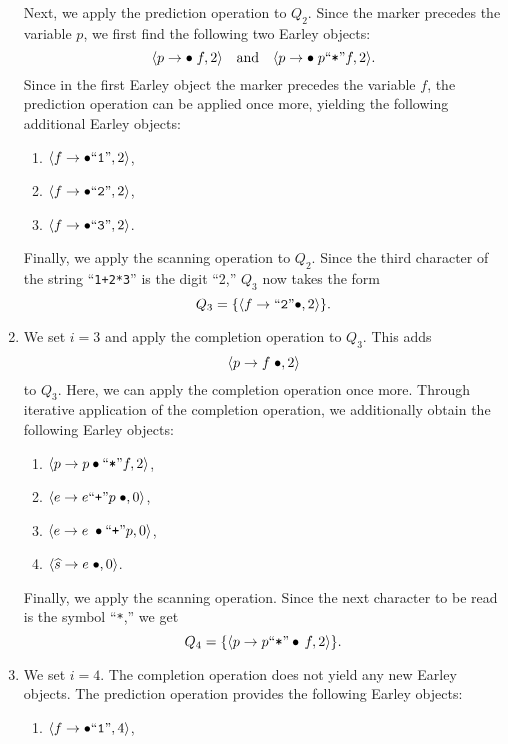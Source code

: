 \begin{enumerate}
      Next, we apply the prediction operation to $Q_2$. Since the marker precedes the variable $p$, we first
      find the following two Earley objects:   
      \[
        \pair(p \rightarrow \bullet\; f, 2) \quad \text{and} \quad \pair(p \rightarrow \bullet\; p \squoted{*} f, 2).
      \]  
      Since in the first Earley object the marker precedes the variable $f$, the prediction operation can be
      applied once more, yielding the following additional Earley objects:   
      \begin{enumerate}
      \item $\pair(f \rightarrow \bullet \squoted{1}, 2)$, 
      \item $\pair(f \rightarrow \bullet \squoted{2}, 2)$,
      \item $\pair(f \rightarrow \bullet \squoted{3}, 2)$.
      \end{enumerate}  
      Finally, we apply the scanning operation to $Q_2$. Since the third character of the string
      “\texttt{1+2*3}” is the digit “2,” $Q_3$ now takes the form   
      \[
        Q_3 = \{ \pair(f \rightarrow \squoted{2}\bullet, 2) \}.
      \]
\item We set $i = 3$ and apply the completion operation to $Q_3$. This adds  
      \[
        \pair(p \rightarrow f \;\bullet, 2)
      \]  
      to $Q_3$. Here, we can apply the completion operation once more. Through iterative application of the
      completion operation, we additionally obtain the following Earley objects:   
      \begin{enumerate}
      \item $\pair(p \rightarrow p \bullet \squoted{*} f, 2)$,
      \item $\pair(e \rightarrow e \squoted{+} p\;\bullet, 0)$,
      \item $\pair(e \rightarrow e\;\bullet \squoted{+} p, 0)$,
      \item $\pair(\widehat{s} \rightarrow e\;\bullet, 0)$.
      \end{enumerate}  
      Finally, we apply the scanning operation. Since the next character to be read is the symbol “\texttt{*},”
      we get   
      \[
        Q_4 = \{ \pair(p \rightarrow p \squoted{*} \bullet\, f, 2) \}.
      \] 
\item We set $i = 4$. The completion operation does not yield any new Earley objects. The prediction operation
      provides the following Earley objects:   
      \begin{enumerate}
      \item $\pair(f \rightarrow \bullet \squoted{1}, 4)$, 

\end{enumerate}
\end{enumerate}
